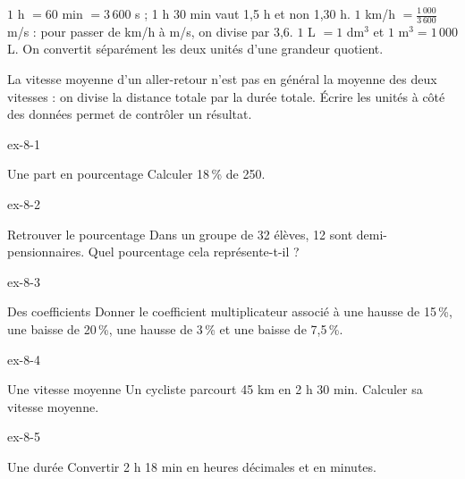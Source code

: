 \begin{savoirfaire}$1$ h $=60$ min $=3\,600$ s ; 1 h 30 min vaut 1,5 h et non 1,30 h. $1$ km/h $=\frac{1\,000}{3\,600}$ m/s : pour passer de km/h à m/s, on divise par 3,6. $1$ L $=1$ dm$^3$ et $1$ m$^3=1\,000$ L. On convertit séparément les deux unités d’une grandeur quotient.\end{savoirfaire}
\begin{attention}La vitesse moyenne d’un aller-retour n’est pas en général la moyenne des deux vitesses : on divise la distance totale par la durée totale. Écrire les unités à côté des données permet de contrôler un résultat.\end{attention}

\clearpage{}
\begin{blocLivre}{ex-8-1}\begin{exercice}[1]{Une part en pourcentage}
Calculer 18\,\% de 250.
\end{exercice}\end{blocLivre}
\begin{blocLivre}{ex-8-2}\begin{exercice}[1]{Retrouver le pourcentage}
Dans un groupe de 32 élèves, 12 sont demi-pensionnaires. Quel pourcentage cela représente-t-il ?
\end{exercice}\end{blocLivre}
\begin{blocLivre}{ex-8-3}\begin{exercice}[1]{Des coefficients}
Donner le coefficient multiplicateur associé à une hausse de 15\,\%, une baisse de 20\,\%, une hausse de 3\,\% et une baisse de 7,5\,\%.
\end{exercice}\end{blocLivre}
\begin{blocLivre}{ex-8-4}\begin{exercice}[1]{Une vitesse moyenne}
Un cycliste parcourt 45 km en 2 h 30 min. Calculer sa vitesse moyenne.
\end{exercice}\end{blocLivre}
\begin{blocLivre}{ex-8-5}\begin{exercice}[1]{Une durée}
Convertir 2 h 18 min en heures décimales et en minutes.
\end{exercice}\end{blocLivre}

